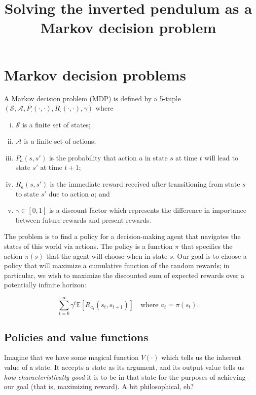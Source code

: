 \documentclass[12pt]{article}
\title{Solving the inverted pendulum as a Markov decision problem}
\date{}
\begin{document}
\maketitle

\section{Markov decision problems}

A Markov decision problem (MDP) is defined by a 5-tuple $(\mathscr{S}, \mathscr{A}, P_\cdot(\cdot, \cdot), R_\cdot(\cdot, \cdot), \gamma)$ where

\begin{enumerate}[(i)]
\item $\mathscr{S}$ is a finite set of states;
\item $\mathscr{A}$ is a finite set of actions;
\item $P_a(s, s')$ is the probability that action $a$ in state $s$ at time $t$ will lead to state $s'$ at time $t + 1$;
\item $R_a(s, s')$ is the immediate reward received after transitioning from state $s$ to state $s'$ due to action $a$; and
\item $\gamma \in [0, 1]$ is a discount factor which represents the difference in importance between future rewards and present rewards.
\end{enumerate}

The problem is to find a policy for a decision-making agent that navigates the states of this world via actions. The policy is a function $\pi$ that specifies the action $\pi(s)$ that the agent will choose when in state $s$. Our goal is to choose a policy that will maximize a cumulative function of the random rewards; in particular, we wish to maximize the discounted sum of expected rewards over a potentially infinite horizon:

\begin{equation}
\sum_{t = 0}^{\infty} \gamma^t \mathbb{E}[R_{a_t}(s_t, s_{t+1})] \quad \mbox{where } a_t = \pi(s_t).
\end{equation}

\subsection{Policies and value functions}

Imagine that we have some magical function $V(\cdot)$ which tells us the inherent value of a state. It accepts a state as its argument, and its output value tells us \emph{how characteristically good} it is to be in that state for the purposes of achieving our goal (that is, maximizing reward). A bit philosophical, eh?
\end{document}
